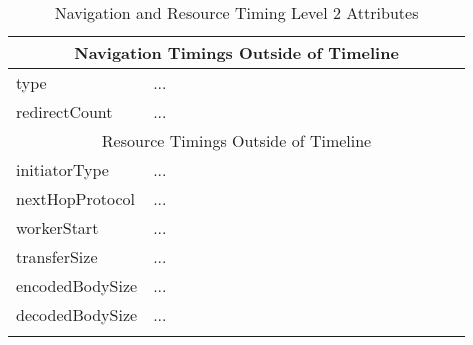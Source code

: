 \begin{center}
\begin{longtable}{ | p{0.3\linewidth} | p{0.7\linewidth} | }
	\hline
	\multicolumn{2}{|c|}{Navigation Timings Outside of Timeline} \\
	\hline
	type & ... \\
	\hline
	redirectCount & ... \\

	\hline
	\multicolumn{2}{|c|}{Resource Timings Outside of Timeline} \\
	\hline
	initiatorType & ... \\
	\hline
	nextHopProtocol & ... \\
	\hline
	workerStart & ... \\
	\hline
	transferSize & ... \\
	\hline
	encodedBodySize & ... \\
	\hline
	decodedBodySize & ... \\
	\hline
	
	\caption{Navigation and Resource Timing Level 2 Attributes} %
	\label{tab:navigationtiming}
	\end{longtable}
\end{center}
















